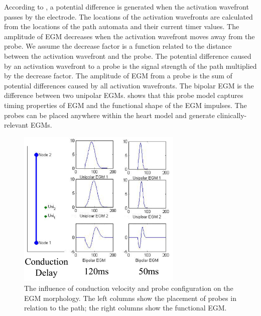 According to \cite{recording}, a potential difference is generated when the activation wavefront passes by the electrode. 
The locations of the activation wavefronts are calculated from the locations of the path automata and their current timer values. 
The amplitude of EGM decreases when the activation wavefront moves away from the probe. 
We assume the decrease factor is a function related to the distance between the activation wavefront and the probe. 
The potential difference caused by an activation wavefront to a probe is the signal strength of the path multiplied by the decrease factor. 
The amplitude of EGM from a probe is the sum of potential differences caused by all activation wavefronts. 
The bipolar EGM is the difference between two unipolar EGMs. 
 shows that this probe model captures timing properties of EGM and the functional shape of the EGM impulses. 
The probes can be placed anywhere within the heart model and generate clinically-relevant EGMs. 
\begin{figure}[!t]
\center
		\includegraphics[width=0.7\textwidth]{figs/fig7.png}
\caption{The influence of conduction velocity and probe configuration on the EGM morphology. The left columns show the placement of probes in relation to the path; the right columns show the functional EGM.}
\label{fig:egm_s}
\end{figure}


